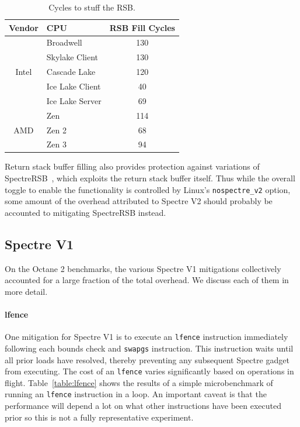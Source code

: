 \begin{table}[h]
  \begin{center}
  \begin{tabular}{clc}
      \textbf{Vendor} & \textbf{CPU} & \textbf{RSB Fill Cycles} \\ \hline
      \multirow{5}{*}{Intel} & Broadwell       & 130 \\
                             & Skylake Client  & 130 \\
                             & Cascade Lake    & 120 \\
                             & Ice Lake Client & 40 \\
                             & Ice Lake Server & 69 \\ \hline
      \multirow{3}{*}{AMD}   & Zen             & 114 \\
                             & Zen 2           & 68 \\
                             & Zen 3           & 94 \\ \hline
  \end{tabular}
  \end{center}
  \caption{Cycles to stuff the RSB. }
  \label{table:rsb-fill}
\end{table}

Return stack buffer filling also provides protection against variations of
SpectreRSB~\cite{koruyeh:spectrersb}, which exploits the return stack buffer itself.
Thus while the overall toggle to enable the functionality is controlled by Linux's \texttt{nospectre\_v2} option, some amount of the overhead attributed to Spectre V2 should probably be accounted to mitigating SpectreRSB instead.

\subsection{Spectre V1}

On the Octane 2 benchmarks, the various Spectre V1 mitigations collectively accounted for a large fraction of the total overhead.
We discuss each of them in more detail.

\paragraph{lfence}

One mitigation for Spectre V1 is to execute an \texttt{lfence} instruction immediately following each bounds check and \texttt{swapgs} instruction.
This instruction waits until all prior loads have resolved, thereby preventing any subsequent Spectre gadget from executing.
The cost of an \texttt{lfence} varies significantly based on operations in flight.
Table~\ref{table:lfence} shows the results of a simple microbenchmark of running an \texttt{lfence} instruction in a loop.
An important caveat is that the performance will depend a lot on what other instructions have been executed prior so this is not a fully representative experiment.

